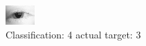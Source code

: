 \begin{figure}[h!]
\begin{center}
\includegraphics[width=0.60\columnwidth]{figures/ID73_class_4_target_3.png}
\end{center}
\caption{ Classification: 4 actual target: 3}
\label{fig:ID73_class_4_target_3}
\end{figure}
